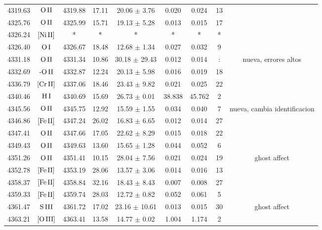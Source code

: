 \documentclass{article}
\begin{document}
\begin{table*}
\begin{adjustbox}{width=\textwidth}
\begin{tabular}{ccccccccc}
4319.63 & $\mbox{O}\thinspace \mbox{II}$ & 4319.88 & 17.11 & 20.06 $\pm$ 3.76 & 0.020 & 0.024 & 13 &  \\
4325.76 & $\mbox{O}\thinspace \mbox{II}$ & 4325.99 & 15.71 & 19.13 $\pm$ 5.28 & 0.013 & 0.015 & 17 &  \\
4326.24 & $\mbox{[Ni}\thinspace \mbox{II]}$ & * & * & * & * & * & * &  \\
4326.40 & $\mbox{O}\thinspace \mbox{I}$ & 4326.67 & 18.48 & 12.68 $\pm$ 1.34 & 0.027 & 0.032 & 9 &  \\
4331.18 & $\mbox{O}\thinspace \mbox{II}$ & 4331.34 & 10.86 & 30.18 $\pm$ 29.43 & 0.012 & 0.014 & : &  nueva, errores altos \\
4332.69 & $\mbox{-O}\thinspace \mbox{II}$ & 4332.87 & 12.24 & 20.13 $\pm$ 5.98 & 0.016 & 0.019 & 18 &  \\
4336.79 & $\mbox{[Cr}\thinspace \mbox{II]}$ & 4337.06 & 18.46 & 23.43 $\pm$ 9.82 & 0.021 & 0.025 & 22 &  \\
4340.46 & $\mbox{H}\thinspace \mbox{I}$ & 4340.69 & 15.69 & 26.73 $\pm$ 0.01 & 38.838 & 45.762 & 2 &  \\
4345.56 & $\mbox{O}\thinspace \mbox{II}$ & 4345.75 & 12.92 & 15.59 $\pm$ 1.55 & 0.034 & 0.040 & 7 &  nueva, cambia identificacion \\
4346.86 & $\mbox{[Fe}\thinspace \mbox{II]}$ & 4347.24 & 26.02 & 16.83 $\pm$ 6.65 & 0.012 & 0.014 & 27 &  \\
4347.41 & $\mbox{O}\thinspace \mbox{II}$ & 4347.66 & 17.05 & 22.62 $\pm$ 8.29 & 0.015 & 0.018 & 22 &  \\
4349.43 & $\mbox{O}\thinspace \mbox{II}$ & 4349.63 & 13.60 & 15.65 $\pm$ 1.28 & 0.044 & 0.052 & 6 &  \\
4351.26 & $\mbox{O}\thinspace \mbox{II}$ & 4351.41 & 10.15 & 28.04 $\pm$ 7.56 & 0.021 & 0.024 & 19 &  ghost affect \\
4352.78 & $\mbox{[Fe}\thinspace \mbox{II]}$ & 4353.19 & 28.06 & 13.57 $\pm$ 3.06 & 0.014 & 0.016 & 13 &  \\
4358.37 & $\mbox{[Fe}\thinspace \mbox{II]}$ & 4358.84 & 32.16 & 18.43 $\pm$ 8.43 & 0.007 & 0.008 & 27 &  \\
4359.33 & $\mbox{[Fe}\thinspace \mbox{II]}$ & 4359.74 & 28.03 & 12.72 $\pm$ 0.82 & 0.052 & 0.061 & 5 &  \\
4361.47 & $\mbox{S}\thinspace \mbox{III}$ & 4361.72 & 17.02 & 23.16 $\pm$ 10.61 & 0.013 & 0.015 & 30 &  ghost affect \\
4363.21 & $\mbox{[O}\thinspace \mbox{III]}$ & 4363.41 & 13.58 & 14.77 $\pm$ 0.02 & 1.004 & 1.174 & 2 &  \\

\end{tabular}
\end{adjustbox}
\end{table*}
\end{document}
